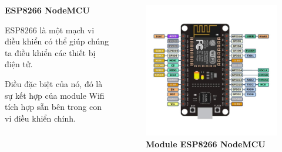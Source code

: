\documentclass[11pt]{beamer}
\renewcommand{\label}[1]{%
			\gdef\sfname{sf:##1}}%
\begin{document}
\begin{frame}[c]{}
		
		\begin{columns}
			\begin{column}{0.4\textwidth}

				\textbf{ESP8266 NodeMCU}

				\vspace{1em}

				ESP8266 là một mạch vi điều khiển có thể giúp chúng ta điều khiển các thiết bị điện tử. 
		
				\vspace{2em}

				Điều đặc biệt của nó, đó là sự kết hợp của module Wifi tích hợp sẵn bên trong con vi điều khiển chính.

			\end{column}

			\begin{column}{0.6\textwidth} 
				\begin{figure}[h]
					\includegraphics[width=1\textwidth]{Image/Fig. 2 ESP8266.jpg}
					\caption{\centering \textbf{Module ESP8266 NodeMCU}}
				\end{figure}			
			\end{column}
		\end{columns}

\end{frame}
\end{document}
